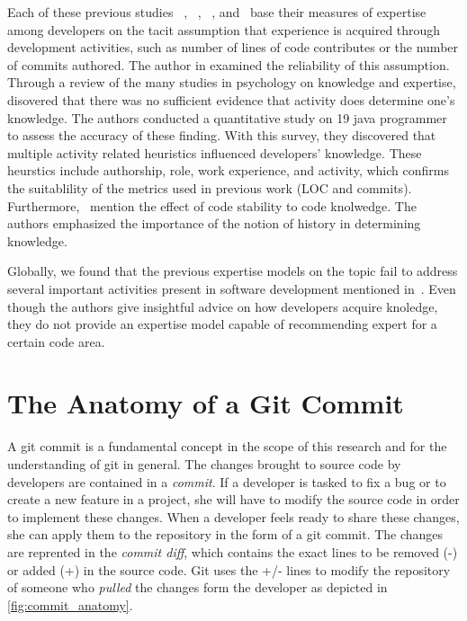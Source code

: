 Each of these previous studies ~\citep{Bhattacharya}, ~\citep{mockus02}, ~\citep{McDonald}, and~\citep{Fritz-2007} base their measures of expertise among developers on the tacit assumption that experience is acquired through development activities, such as number of lines of code contributes or the number of commits authored. The author in \citep{Fritz-2007} examined the reliability of this assumption. Through a review of the many studies in psychology on knowledge and expertise, \citep{Fritz-2007} disovered that there was no sufficient evidence that activity does determine one's knowledge. The authors conducted a quantitative study on 19 java programmer to assess the accuracy of these finding. With this survey, they discovered that multiple activity related heuristics influenced developers' knowledge. These heurstics include authorship, role, work experience, and activity, which confirms the suitablility of the metrics used in previous work (LOC and commits). Furthermore,~\citep{Fritz-2007} mention the effect of code stability to code knolwedge. The authors emphasized the importance of the notion of history in determining knowledge.  

Globally, we found that the previous expertise models on the topic fail to address several important activities present in software development mentioned in~\citep{Fritz-2007}. Even though the authors give insightful advice on how developers acquire knoledge, they do not provide an expertise model capable of recommending expert for a certain code area. 

\section{The Anatomy of a Git Commit}
\label{sec:commit_anatomy}

A git commit is a fundamental concept in the scope of this research and for the understanding of git in general. The changes brought to source code by developers are contained in a \textit{commit}. If a developer is tasked to fix a bug or to create a new feature in a project, she will have to modify the source code in order to implement these changes. When a developer feels ready to share these changes, she can apply them to the repository in the form of a git commit. The changes are reprented in the \textit{commit diff}, which contains the exact lines to be removed (-) or added (+) in the source code. Git uses the +/- lines to modify the repository of someone who \textit{pulled} the changes form the developer as depicted in \autoref{fig:commit_anatomy}. 

